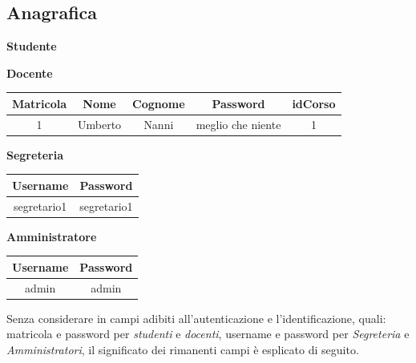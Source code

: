 \documentclass [a4paper,11pt]{book}
\begin{document}
\subsection{Anagrafica}

\textbf{Studente}

\medskip


\medskip

\textbf{Docente}

\medskip

\begin{tabular}{|c|c|c|c|c|}
\hline
Matricola & Nome & Cognome & Password & idCorso\\
\hline
1 & Umberto & Nanni & meglio che niente & 1\\
\hline
\end{tabular}

\medskip

\textbf{Segreteria}

\medskip

\begin{tabular}{|c|c|}
\hline
Username & Password \\
\hline
segretario1 & segretario1\\
\hline
\end{tabular}

\medskip

\textbf{Amministratore}

\medskip


\begin{tabular}{|c|c|}
\hline
Username & Password \\
\hline
admin & admin\\
\hline
\end{tabular}

\medskip
\medskip

Senza considerare in campi adibiti all'autenticazione e l'identificazione, quali: matricola e password per \emph{studenti} e \emph{docenti}, username e password per \emph{Segreteria} e \emph{Amministratori}, il significato dei rimanenti campi è esplicato di seguito.
\end{document}
